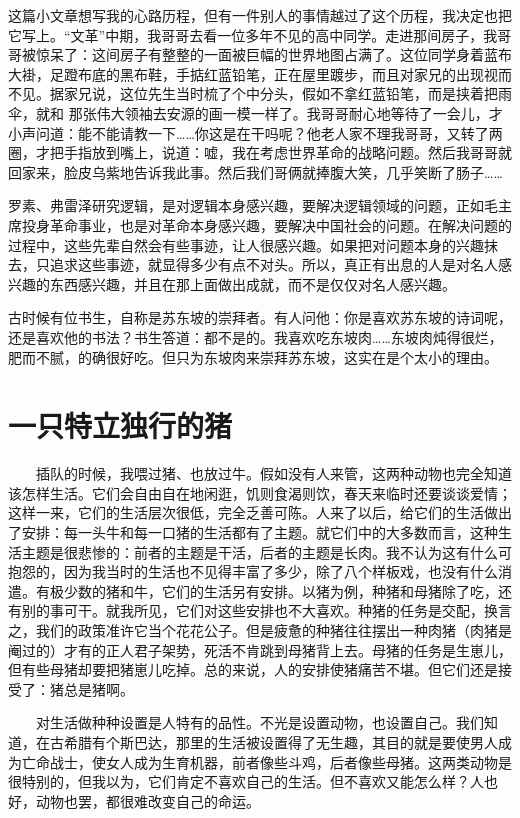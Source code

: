 这篇小文章想写我的心路历程，但有一件别人的事情越过了这个历程，我决定也把它写上。“文革”中期，我哥哥去看一位多年不见的高中同学。走进那间房子，我哥哥被惊呆了：这间房子有整整的一面被巨幅的世界地图占满了。这位同学身着蓝布大褂，足蹬布底的黑布鞋，手掂红蓝铅笔，正在屋里踱步，而且对家兄的出现视而不见。据家兄说，这位先生当时梳了个中分头，假如不拿红蓝铅笔，而是挟着把雨伞，就和 那张伟大领袖去安源的画一模一样了。我哥哥耐心地等待了一会儿，才小声问道：能不能请教一下……你这是在干吗呢？他老人家不理我哥哥，又转了两圈，才把手指放到嘴上，说道：嘘，我在考虑世界革命的战略问题。然后我哥哥就回家来，脸皮乌紫地告诉我此事。然后我们哥俩就捧腹大笑，几乎笑断了肠子…… 

罗素、弗雷泽研究逻辑，是对逻辑本身感兴趣，要解决逻辑领域的问题，正如毛主席投身革命事业，也是对革命本身感兴趣，要解决中国社会的问题。在解决问题的过程中，这些先辈自然会有些事迹，让人很感兴趣。如果把对问题本身的兴趣抹去，只追求这些事迹，就显得多少有点不对头。所以，真正有出息的人是对名人感兴趣的东西感兴趣，并且在那上面做出成就，而不是仅仅对名人感兴趣。 

古时候有位书生，自称是苏东坡的崇拜者。有人问他：你是喜欢苏东坡的诗词呢，还是喜欢他的书法？书生答道：都不是的。我喜欢吃东坡肉……东坡肉炖得很烂，肥而不腻，的确很好吃。但只为东坡肉来崇拜苏东坡，这实在是个太小的理由。

\chapter{一只特立独行的猪}

　　插队的时候，我喂过猪、也放过牛。假如没有人来管，这两种动物也完全知道该怎样生活。它们会自由自在地闲逛，饥则食渴则饮，春天来临时还要谈谈爱情；这样一来，它们的生活层次很低，完全乏善可陈。人来了以后，给它们的生活做出了安排：每一头牛和每一口猪的生活都有了主题。就它们中的大多数而言，这种生活主题是很悲惨的：前者的主题是干活，后者的主题是长肉。我不认为这有什么可抱怨的，因为我当时的生活也不见得丰富了多少，除了八个样板戏，也没有什么消遣。有极少数的猪和牛，它们的生活另有安排。以猪为例，种猪和母猪除了吃，还有别的事可干。就我所见，它们对这些安排也不大喜欢。种猪的任务是交配，换言之，我们的政策准许它当个花花公子。但是疲惫的种猪往往摆出一种肉猪（肉猪是阉过的）才有的正人君子架势，死活不肯跳到母猪背上去。母猪的任务是生崽儿，但有些母猪却要把猪崽儿吃掉。总的来说，人的安排使猪痛苦不堪。但它们还是接受了：猪总是猪啊。

　　对生活做种种设置是人特有的品性。不光是设置动物，也设置自己。我们知道，在古希腊有个斯巴达，那里的生活被设置得了无生趣，其目的就是要使男人成为亡命战士，使女人成为生育机器，前者像些斗鸡，后者像些母猪。这两类动物是很特别的，但我以为，它们肯定不喜欢自己的生活。但不喜欢又能怎么样？人也好，动物也罢，都很难改变自己的命运。

